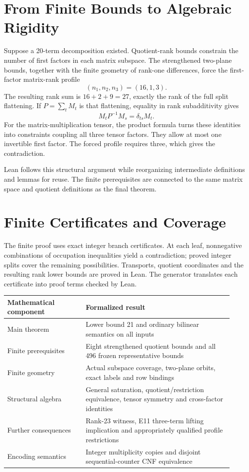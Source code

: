 \documentclass[11pt]{article}
\begin{document}
\section{From Finite Bounds to Algebraic Rigidity}
Suppose a 20-term decomposition existed. Quotient-rank bounds constrain the
number of first factors in each matrix subspace. The strengthened
two-plane bounds, together with the finite geometry of rank-one differences,
force the first-factor matrix-rank profile
\begin{equation}
  (n_1,n_2,n_3)=(16,1,3).
\end{equation}
The resulting rank sum is $16+2+9=27$, exactly the rank of the full split
flattening. If $P=\sum_t M_t$ is that flattening, equality in rank
subadditivity gives
\begin{equation}
  M_tP^{-1}M_s=\delta_{ts}M_t.
\end{equation}
For the matrix-multiplication tensor, the product formula turns these
identities into constraints coupling all three tensor factors. They allow
at most one invertible first factor. The forced profile requires three,
which gives the contradiction.

Lean follows this structural argument while reorganizing intermediate
definitions and lemmas for reuse. The finite prerequisites are connected
to the same matrix space and quotient definitions as the final theorem.

\section{Finite Certificates and Coverage}
The finite proof uses exact integer branch certificates. At each leaf,
nonnegative combinations of occupation inequalities yield a contradiction;
proved integer splits cover the remaining possibilities. Transports,
quotient coordinates and the resulting rank lower bounds are proved in Lean.
The generator translates each certificate into proof terms checked by Lean.

\begin{center}
\begin{tabular}{@{}p{0.32\linewidth}p{0.60\linewidth}@{}}
\toprule
Mathematical component & Formalized result \\
\midrule
Main theorem & Lower bound 21 and ordinary bilinear semantics on all inputs \\
Finite prerequisites & Eight strengthened quotient bounds and all 496 frozen representative bounds \\
Finite geometry & Actual subspace coverage, two-plane orbits, exact labels and row bindings \\
Structural algebra & General saturation, quotient/restriction equivalence, tensor symmetry and cross-factor identities \\
Further consequences & Rank-23 witness, E11 three-term lifting implication and appropriately qualified profile restrictions \\
Encoding semantics & Integer multiplicity copies and disjoint sequential-counter CNF equivalence \\
\bottomrule
\end{tabular}
\end{center}
\end{document}
